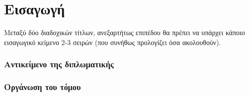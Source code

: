 

\chapter{Εισαγωγή}

Μεταξύ δύο διαδοχικών τίτλων, ανεξαρτήτως επιπέδου θα πρέπει να υπάρχει κάποιο εισαγωγικό κείμενο 2-3 σειρών (που συνήθως προλογίζει όσα ακολουθούν). 

\subsection{ Αντικείμενο της διπλωματικής}
\subsection{ Οργάνωση του τόμου}
\clearpage